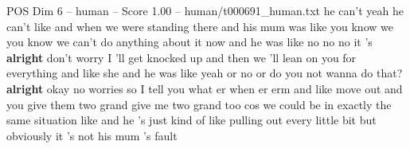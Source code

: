 \begin{textsample}{POS Dim 6 – human – Score 1.00 – human/t000691\_human.txt}  \label{ex:f6_pos_013}
he can't yeah he can't like and when we were standing there and his mum was like you know we you know we can't do anything about it now and he was like no no no it 's \textbf{alright} don't worry I 'll get knocked up and then we 'll lean on you for everything and like she and he was like yeah or no or do you not wanna do that? \textbf{alright} okay no worries so I tell you what er when er erm and like move out and you give them two grand give me two grand too cos we could be in exactly the same situation like and he 's just kind of like pulling out every little bit but obviously it 's not his mum 's fault

\end{textsample}
